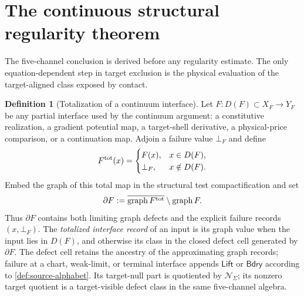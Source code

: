 \documentclass[11pt]{article}
\numberwithin{section}{part}
\theoremstyle{plain}
\theoremstyle{definition}
\newtheorem{definition}[definition]{Definition}
\theoremstyle{remark}
\newcommand{\Lift}{\mathsf{Lift}}
\newcommand{\Bdry}{\mathsf{Bdry}}
\newcommand{\Null}{\mathscr N}
\begin{document}
\section{The continuous structural regularity theorem}
\label{sec:structural-regularity-theorem}

The five-channel conclusion is derived before any regularity estimate.  The
only equation-dependent step in target exclusion is the physical evaluation
of the target-aligned class exposed by contact.

\begin{definition}[Totalization of a continuum interface]
\label{def:totalized-continuum-interface}
Let \(F:D(F)\subset X_F\to Y_F\) be any partial interface used by the
continuum argument: a constitutive realization, a gradient potential map, a
target-shell derivative, a physical-price comparison, or a continuation map.
Adjoin a failure value \(\bot_F\) and define
\[
 F^{\rm tot}(x)=
 \begin{cases}
 F(x),&x\in D(F),\\
 \bot_F,&x\notin D(F).
 \end{cases}
\]
Embed the graph of this total map in the structural test compactification and
set
\begin{equation}
 \label{eq:interface-graph-boundary}
 \partial F
 :=\overline{\operatorname{graph}F^{\rm tot}}
   \setminus\operatorname{graph}F.
\end{equation}
Thus \(\partial F\) contains both limiting graph defects and the explicit
failure records \((x,\bot_F)\).  The \emph{totalized interface record} of an
input is its graph value when the input lies in \(D(F)\), and otherwise its
class in the closed defect cell generated by \(\partial F\).  The defect cell
retains the ancestry of
the approximating graph records; failure at a chart, weak-limit, or terminal
interface appends \(\Lift\) or \(\Bdry\) according to
\cref{def:source-alphabet}.  Its target-null part is quotiented by
\(\Null_\Sigma\); its nonzero target quotient is a target-visible defect
class in the same five-channel algebra.
\end{definition}
\end{document}
